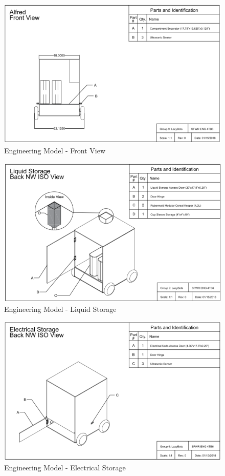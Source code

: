 \documentclass [10pt]{article}
\begin{document}
\begin{figure}
	\centering
	\includegraphics [scale = 0.55] {figures/CAD_Front_View.png}
	\caption{Engineering Model - Front View}
\end{figure}
	
\begin{figure}
	\centering
	\includegraphics [scale = 0.55] {figures/CAD_Liquid_Storage.png}
	\caption{Engineering Model - Liquid Storage}
\end{figure}
	
\begin{figure}
	\centering
	\includegraphics [scale = 0.55] {figures/CAD_Electrical_Storage.png}
	\caption{Engineering Model - Electrical Storage}
\end{figure}
	
\end{document}

